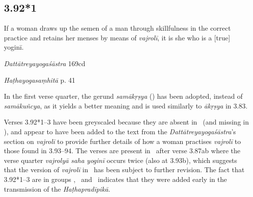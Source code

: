 \begin{ekdosis}


\subsection*{3.92*1}
\begin{translation}[hp03_092_1]
If a woman draws up the semen of a man through skillfulness in the correct practice and retains her menses by means of \emph{vajrolī}, it is she who is a [true] yoginī.
\end{translation}

\begin{sources}[hp03_092_1]
\emph{Dattātreyayogaśāstra} 169cd
\begin{versinnote}
\end{versinnote}
\end{sources}

\begin{testimonia}[hp03_092_1]
\emph{Haṭhayogasaṃhitā} p. 41
\begin{versinnote}
\end{versinnote}
\end{testimonia}

\begin{philcomm}[hp03_092_1]
In the first verse quarter, the gerund \emph{samākṛṣya} (\textgamma) has been adopted, instead of \emph{samākuñcya}, as it yields a better meaning and is used similarly to \emph{ākṛṣya} in 3.83.

Verses 3.92*1–3 have been greyscaled because they are absent in \alphaThree \ (and missing in  \alphaOne), and appear to have been added to the text from the \emph{Dattātreyayogaśāstra}'s section on \emph{vajrolī} to provide further details of how a woman practises \emph{vajrolī} to those found in 3.93–94. The verses are present in \alphaTwo\ after verse 3.87ab where the verse quarter \emph{vajrolyā saha yoginī} occurs twice (also at 3.93b), which suggests that the version of \emph{vajrolī} in \alphaTwo\ has been subject to further revision. The fact that 3.92*1–3 are in groups \textbeta, \textgamma\ and \texteta\ indicates that they were added early in the transmission of the \emph{Haṭhapradīpikā}.     
\end{philcomm}


\end{ekdosis}
